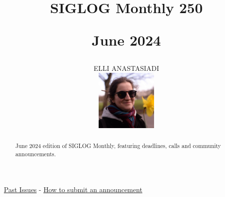 \documentclass[prodmode,acmtecs]{acmsmall} %
\newcounter{colstart}
\begin{document}
\setcounter{colstart}{\thepage}

\title{{\huge\sc SIGLOG Monthly 250}

 June 2024}\author{ELLI ANASTASIADI\vspace*{-2.6cm}\begin{flushright}\includegraphics[width=30mm]{elli_anastasiadi.png}\end{flushright}}\begin{abstract}June 2024 edition of SIGLOG Monthly, featuring deadlines, calls and community announcements.
\end{abstract}


\maketitlee

\href{https://lics.siglog.org/newsletters/}{Past Issues}
 - 
\href{https://lics.siglog.org/newsletters/inst.html}{How to submit an announcement}
\end{document}
